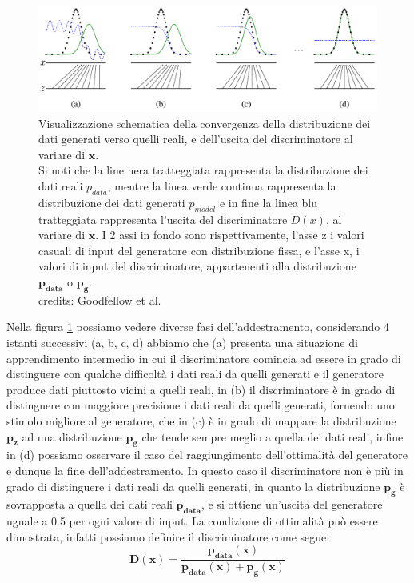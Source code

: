\begin{figure}[H]
    \centering
    \includegraphics[width=1.0\textwidth]{imgs/Gan training convergence.png}
    \caption{Visualizzazione schematica della convergenza della distribuzione dei dati generati verso quelli reali, e dell'uscita del discriminatore al variare di $\mathbf{x}$.\\
    Si noti che la line nera tratteggiata rappresenta la distribuzione dei dati reali $p_{data}$, mentre la linea verde continua rappresenta la distribuzione dei dati generati $p_{model}$ e
    in fine la linea blu tratteggiata rappresenta l'uscita del discriminatore $D(x)$, al variare di $\mathbf{x}$. 
    I 2 assi in fondo sono rispettivamente, l'asse z i valori casuali di input del generatore con distribuzione fissa, e l'asse x, 
    i valori di input del discriminatore, appartenenti alla distribuzione $\mathbf{p_{data}}$ o $\mathbf{p_{g}}$.\\
    credits: Goodfellow et al. \cite{goodfellow2014generative}}
    \label{fig:gan_training_convergence}
\end{figure}

Nella figura \ref{fig:gan_training_convergence} possiamo vedere diverse fasi dell'addestramento, considerando 4 istanti successivi (a, b, c, d) abbiamo che (a) 
presenta una situazione di apprendimento intermedio in cui il discriminatore comincia ad essere in grado di distinguere con qualche difficoltà i dati reali da quelli
generati e il generatore produce dati piuttosto vicini a quelli reali, in (b) il discriminatore è in grado di distinguere con maggiore precisione i dati reali da quelli
generati, fornendo uno stimolo migliore al generatore, che in (c) è in grado di mappare la distribuzione $\mathbf{p_{z}}$ ad una distribuzione
$\mathbf{p_{g}}$ che tende sempre meglio a quella dei dati reali, infine in (d) possiamo osservare il caso del raggiungimento dell'ottimalità del generatore e dunque la fine dell'addestramento.
In questo caso il discriminatore non è più in grado di distinguere i dati reali da quelli generati, in quanto la distribuzione $\mathbf{p_{g}}$ è sovrapposta 
a quella dei dati reali $\mathbf{p_{data}}$, e si ottiene un'uscita del generatore uguale a 0.5 per ogni valore di input.
La condizione di ottimalità può essere dimostrata, infatti possiamo definire il discriminatore come segue:
\begin{equation}
    \mathbf{D(x) = \frac{p_{data}(x)}{p_{data}(x) + p_{g}(x)}}
\end{equation}

